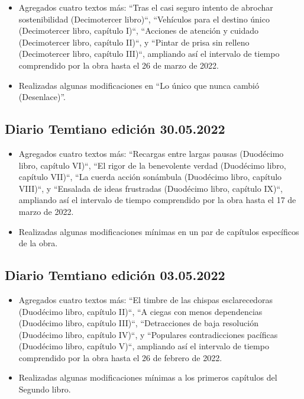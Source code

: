 \documentclass[
]{book}
\begin{document}
\begin{itemize}
\item
  Agregados cuatro textos más: ``Tras el casi seguro intento de abrochar sostenibilidad (Decimotercer libro)``, ``Vehículos para el destino único (Decimotercer libro, capítulo I)``, ``Acciones de atención y cuidado (Decimotercer libro, capítulo II)``, y ``Pintar de prisa sin relleno (Decimotercer libro, capítulo III)``, ampliando así el intervalo de tiempo comprendido por la obra hasta el 26 de marzo de 2022.
\item
  Realizadas algunas modificaciones en ``Lo único que nunca cambió (Desenlace)''.
\end{itemize}

\hypertarget{diario-temtiano-ediciuxf3n-30.05.2022}{%
\subsection*{Diario Temtiano edición 30.05.2022}\label{diario-temtiano-ediciuxf3n-30.05.2022}}

\begin{itemize}
\item
  Agregados cuatro textos más: ``Recargas entre largas pausas (Duodécimo libro, capítulo VI)``, ``El rigor de la benevolente verdad (Duodécimo libro, capítulo VII)``, ``La cuerda acción sonámbula (Duodécimo libro, capítulo VIII)``, y ``Ensalada de ideas frustradas (Duodécimo libro, capítulo IX)``, ampliando así el intervalo de tiempo comprendido por la obra hasta el 17 de marzo de 2022.
\item
  Realizadas algunas modificaciones mínimas en un par de capítulos específicos de la obra.
\end{itemize}

\hypertarget{diario-temtiano-ediciuxf3n-03.05.2022}{%
\subsection*{Diario Temtiano edición 03.05.2022}\label{diario-temtiano-ediciuxf3n-03.05.2022}}

\begin{itemize}
\item
  Agregados cuatro textos más: ``El timbre de las chispas esclarecedoras (Duodécimo libro, capítulo II)``, ``A ciegas con menos dependencias (Duodécimo libro, capítulo III)``, ``Detracciones de baja resolución (Duodécimo libro, capítulo IV)``, y ``Populares contradicciones pacíficas (Duodécimo libro, capítulo V)``, ampliando así el intervalo de tiempo comprendido por la obra hasta el 26 de febrero de 2022.
\item
  Realizadas algunas modificaciones mínimas a los primeros capítulos del Segundo libro.
\end{itemize}
\end{document}
